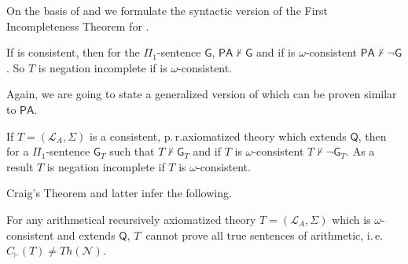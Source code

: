 On the basis of  and  we formulate the syntactic version of the First Incompleteness Theorem for \PA. 

\begin{thm} \label{thm:synfirst}
If \PA is consistent, then for the $\Pi_1$-sentence $\mathsf{G}$, $\mathsf{PA} \nvdash \mathsf{G}$ and if \PA is $\omega$-consistent $\mathsf{PA} \nvdash \mathsf{\lnot G}$. So $T$ is negation incomplete if \PA is $\omega$-consistent.
\end{thm}

Again, we are going to state a generalized version of  which can be proven similar to $\mathsf{PA}$. 

\begin{thm} \label{thm:gensynfirst}
If $T=(\mathcal{L}_A, \Sigma)$ is a consistent, p.\,r.\@ axiomatized theory which extends $\mathsf{Q}$, then for a $\Pi_1$-sentence $\mathsf{G}_T$ such that $T \nvdash \mathsf{G}_T$ and if $T$ is $\omega$-consistent $T \nvdash \lnot \mathsf{G}_T$. As a result $T$ is negation incomplete if $T$ is $\omega$-consistent.
\end{thm}

Craig's Theorem and latter infer the following.
\begin{cor}
For any arithmetical recursively axiomatized theory $T= (\mathcal{L}_A, \Sigma)$ which is $\omega$-consistent and extends $\mathsf{Q}$, $T$~cannot prove all true sentences of arithmetic, i.\,e.\@ $C_\vdash(T)\neq\mathit{Th}(\mathcal{N})$.
\end{cor}